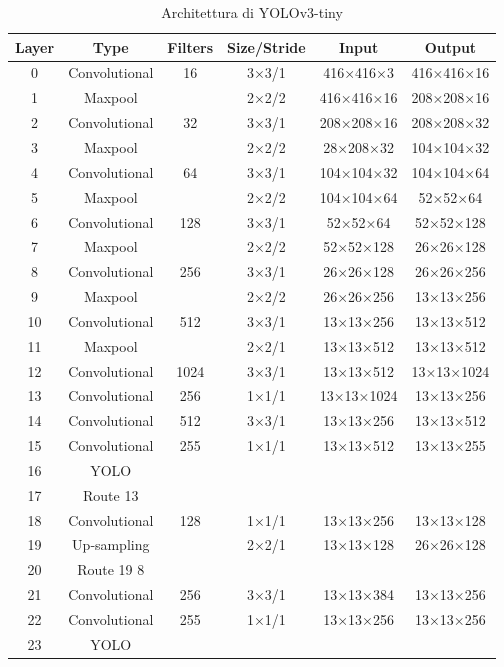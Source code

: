 \documentclass[a4paper]{article}
\begin{document}
	\begin{table}[htpb]
		\centering
		\begin{tabular}{|c|c|c|c|c|c|}
			\hline
			Layer & Type & Filters & Size/Stride & Input & Output \\ \hline
			0 & Convolutional & 16 & 3×3/1 & 416×416×3 & 416×416×16 \\
			1 & Maxpool && 2×2/2 & 416×416×16 & 208×208×16\\
			2 & Convolutional & 32 & 3×3/1 & 208×208×16&208×208×32\\
			3 & Maxpool & & 2×2/2 & 28×208×32 & 104×104×32 \\
			4 & Convolutional & 64 & 3×3/1 & 104×104×32 & 104×104×64\\
			5 & Maxpool & & 2×2/2 & 104×104×64 & 52×52×64\\
			6 & Convolutional & 128 & 3×3/1 & 52×52×64 & 52×52×128\\
			7 & Maxpool & & 2×2/2 & 52×52×128 & 26×26×128\\
			8 & Convolutional & 256 & 3×3/1 & 26×26×128 & 26×26×256\\
			9 & Maxpool & & 2×2/2 & 26×26×256 & 13×13×256\\
			10 & Convolutional & 512 & 3×3/1 & 13×13×256 & 13×13×512\\
			11 & Maxpool & & 2×2/1 & 13×13×512 & 13×13×512\\
			12 & Convolutional & 1024 & 3×3/1 & 13×13×512 & 13×13×1024\\
			13 & Convolutional & 256 & 1×1/1 & 13×13×1024 & 13×13×256\\
			14 & Convolutional & 512 & 3×3/1 & 13×13×256 & 13×13×512\\
			15 & Convolutional & 255 & 1×1/1 & 13×13×512 & 13×13×255\\
			16 & YOLO&&&&\\
			17 & Route 13&&&&\\
			18 & Convolutional & 128 & 1×1/1 & 13×13×256 & 13×13×128\\
			19 & Up‐sampling && 2×2/1 & 13×13×128 & 26×26×128\\
			20 & Route 19 8&&&&\\
			21 & Convolutional & 256 & 3×3/1 & 13×13×384 & 13×13×256\\
			22 & Convolutional & 255 & 1×1/1 & 13×13×256 & 13×13×256\\
			23 & YOLO &&&&\\\hline
		\end{tabular}
	    \caption{Architettura di YOLOv3-tiny}
	\label{tab:yolotiny}
	\end{table}
\end{document}
